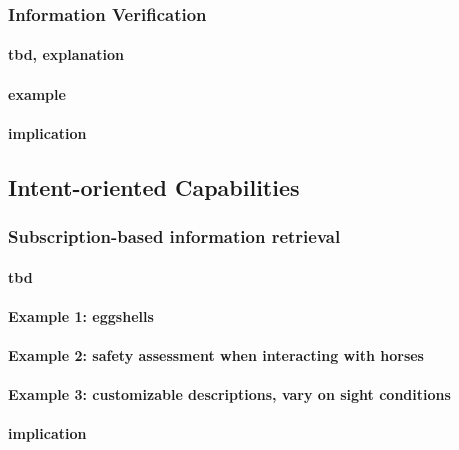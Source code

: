 \subsubsection{Information Verification}

\paragraph{tbd, explanation}

\paragraph{example}


\paragraph{implication}



\subsection{Intent-oriented Capabilities}


\subsubsection{Subscription-based information retrieval}
\paragraph{tbd}


\paragraph{Example 1: eggshells}



\paragraph{Example 2: safety assessment when interacting with horses}



\paragraph{Example 3: customizable descriptions, vary on sight conditions}

\paragraph{implication}



